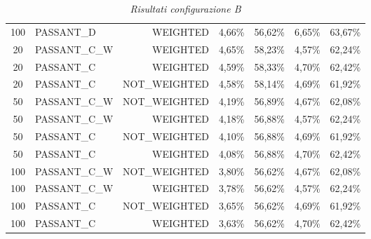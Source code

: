 \begin{table}[H]
{\begin{tabular}{ c l r c c c c }
			100 &  PASSANT\_D &   WEIGHTED &     4,66\% &    56,62\% &     6,65\% &    63,67\% \\
			
			20 & PASSANT\_C\_W &   WEIGHTED &     4,65\% &    58,23\% &     4,57\% &    62,24\% \\
			
			20 &  PASSANT\_C &   WEIGHTED &     4,59\% &    58,33\% &     4,70\% &    62,42\% \\
			
			20 &  PASSANT\_C & NOT\_WEIGHTED &     4,58\% &    58,14\% &     4,69\% &    61,92\% \\
			
			50 & PASSANT\_C\_W & NOT\_WEIGHTED &     4,19\% &    56,89\% &     4,67\% &    62,08\% \\
			
			50 & PASSANT\_C\_W &   WEIGHTED &     4,18\% &    56,88\% &     4,57\% &    62,24\% \\
			
			50 &  PASSANT\_C & NOT\_WEIGHTED &     4,10\% &    56,88\% &     4,69\% &    61,92\% \\
			
			50 &  PASSANT\_C &   WEIGHTED &     4,08\% &    56,88\% &     4,70\% &    62,42\% \\
			
			100 & PASSANT\_C\_W & NOT\_WEIGHTED &     3,80\% &    56,62\% &     4,67\% &    62,08\% \\
			
			100 & PASSANT\_C\_W &   WEIGHTED &     3,78\% &    56,62\% &     4,57\% &    62,24\% \\
			
			100 &  PASSANT\_C & NOT\_WEIGHTED &     3,65\% &    56,62\% &     4,69\% &    61,92\% \\
			
			100 &  PASSANT\_C &   WEIGHTED &     3,63\% &    56,62\% &     4,70\% &    62,42\% \\
			\bottomrule
		\end{tabular}  
	}
	\caption{\emph{Risultati configurazione B}}
\end{table}

